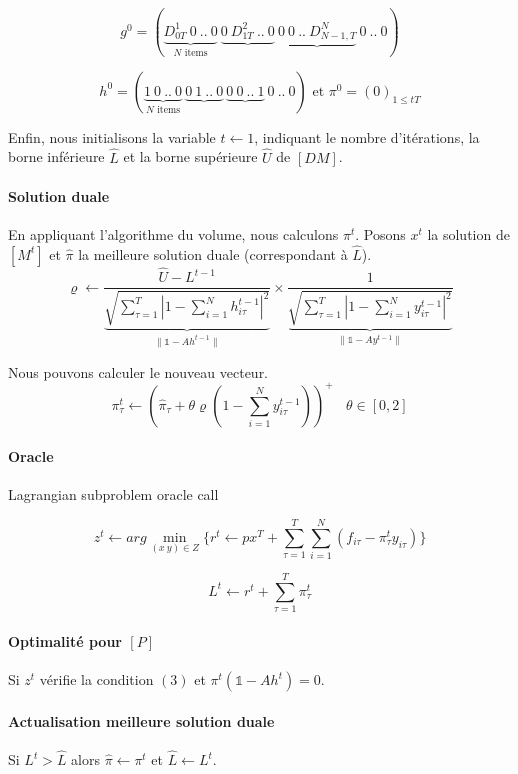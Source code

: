 \documentclass[12pt,a4paper]{article}
\begin{document}
 $$ g^0=(\underbrace{D^1_{0T}~0~..~0}_{N \text{ items}} ~ \underbrace{0~D^2_{1T}~..~0} ~ \underbrace{0~0~..~D^N_{N-1,T}} ~0~..~0) $$ 
 
 $$h^0=(\underbrace{1~0~..~0}_{N \text{ items}} ~ \underbrace{0~1~..~0} ~ \underbrace{0~0~..~1} ~0~..~0) \text{ et } \pi^0=(0)_{1 \leq t T} $$
 
 Enfin, nous initialisons la variable $t \leftarrow 1$, indiquant le nombre d'itérations, la borne inférieure $\hat{L}$ et la borne supérieure $\hat{U}$ de $[DM]$.
 
 \paragraph{Solution duale} En appliquant l'algorithme du volume, nous calculons $\pi^{t}$. Posons $x^t$ la solution de $[M^t]$ et $\hat{\pi}$ la meilleure solution duale (correspondant à $\hat{L}$).
 $$\varrho \leftarrow  \dfrac{\hat{U}-L^{t-1}}{\underbrace{\sqrt{\sum_{\tau=1}^T  
 |1 - \sum_{i=1}^N h_{i \tau}^{t-1}|^2 }}_{\parallel \mathds{1} - Ah^{t-1} \parallel}} \times \dfrac{1}{\underbrace{\sqrt{\sum_{\tau=1}^T |1 - \sum_{i=1}^N y_{i \tau}^{t-1}|^2 }}_{\parallel \mathds{1} - Ay^{t-1} \parallel}}$$
 
 Nous pouvons calculer le nouveau vecteur.
 $$ \pi^t_\tau \leftarrow (\hat{\pi}_\tau + \theta \varrho (1-\sum_{i=1}^Ny^{t-1}_{i\tau}))^+ ~~~~ \theta \in [0,2] $$
 
 \paragraph{Oracle} Lagrangian subproblem oracle call
 
 $$ z^t \leftarrow arg\min_{(x~y)\in Z}\{ r^t \leftarrow px^T +  \sum_{\tau=1}^T \sum_{i=1}^N ( f_{i\tau} - \pi_{\tau}^t y_{i\tau}) \}$$
 
 $$L^t \leftarrow r^t + \sum_{\tau=1}^T \pi_{\tau}^t$$
 
 \paragraph{Optimalité pour $[P]$ } Si $z^t$ vérifie la condition $(3)$ et $\pi^t(\mathds{1} - Ah^t)= 0$.
 
 \paragraph{Actualisation meilleure solution duale} Si $L^t > \hat{L}$ alors $\hat{\pi}\leftarrow \pi^t$ et $\hat{L} \leftarrow L^t$.
 
\end{document}
